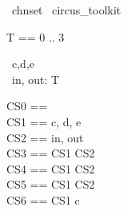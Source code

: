 
\begin{zsection}
  \SECTION\ chnset \parents\ circus\_toolkit
\end{zsection}

\begin{zed}
	T == 0 .. 3 \\
\end{zed}

\begin{circus}
	\circchannel\ c,d,e\\
	\circchannel\ in, out: T\\
\end{circus}

\begin{circus}
    \circchannelset CS0 == \lchanset \rchanset \\
    \circchannelset CS1 == \lchanset c, d, e \rchanset \\
    \circchannelset CS2 == \lchanset in, out \rchanset \\
    \circchannelset CS3 == CS1 \cup CS2 \\
    \circchannelset CS4 == CS1 \cap CS2 \\
    \circchannelset CS5 == CS1 \setminus CS2 \\
    \circchannelset CS6 == CS1 \symdiff \lchanset c \rchanset \\
\end{circus}

